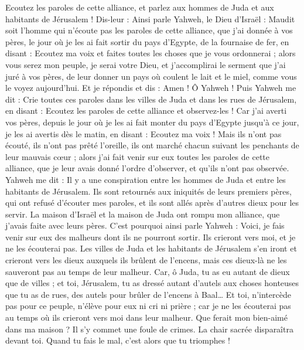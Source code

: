 \begin{multicols}{2}
Ecoutez les paroles de cette alliance, et parlez aux hommes de Juda et aux habitants de Jérusalem !
Dis-leur : Ainsi parle Yahweh, le Dieu d'Israël : Maudit soit l'homme qui n'écoute pas les paroles de cette alliance,
que j'ai donnée à vos pères, le jour où je les ai fait sortir du pays d'Egypte, de la fournaise de fer, en disant : Ecoutez ma voix et faites toutes les choses que je vous ordonnerai ; alors vous serez mon peuple, je serai votre Dieu,
et j'accomplirai le serment que j'ai juré à vos pères, de leur donner un pays où coulent le lait et le miel, comme vous le voyez aujourd'hui. Et je répondis et dis : Amen ! Ô Yahweh !
Puis Yahweh me dit : Crie toutes ces paroles dans les villes de Juda et dans les rues de Jérusalem, en disant : Ecoutez les paroles de cette alliance et observez-les !
Car j'ai averti vos pères, depuis le jour où je les ai fait monter du pays d'Egypte jusqu'à ce jour, je les ai avertis dès le matin, en disant : Ecoutez ma voix !
Mais ils n'ont pas écouté, ils n'ont pas prêté l'oreille, ils ont marché chacun suivant les penchants de leur mauvais cœur ; alors j'ai fait venir sur eux toutes les paroles de cette alliance, que je leur avais donné l'ordre d'observer, et qu'ils n'ont pas observée.
Yahweh me dit : Il y a une conspiration entre les hommes de Juda et entre les habitants de Jérusalem.
Ils sont retournés aux iniquités de leurs premiers pères, qui ont refusé d'écouter mes paroles, et ils sont allés après d'autres dieux pour les servir. La maison d'Israël et la maison de Juda ont rompu mon alliance, que j'avais faite avec leurs pères.
C'est pourquoi ainsi parle Yahweh : Voici, je fais venir sur eux des malheurs dont ils ne pourront sortir. Ils crieront vers moi, et je ne les écouterai pas.
Les villes de Juda et les habitants de Jérusalem s'en iront et crieront vers les dieux auxquels ils brûlent de l'encens, mais ces dieux-là ne les sauveront pas au temps de leur malheur.
Car, ô Juda, tu as eu autant de dieux que de villes ; et toi, Jérusalem, tu as dressé autant d'autels aux choses honteuses que tu as de rues, des autels pour brûler de l'encens à Baal…
Et toi, n'intercède pas pour ce peuple, n'élève pour eux ni cri ni prière ; car je ne les écouterai pas au temps où ils crieront vers moi dans leur malheur.
Que ferait mon bien-aimé dans ma maison ? Il s'y commet une foule de crimes. La chair sacrée disparaîtra devant toi. Quand tu fais le mal, c'est alors que tu triomphes !

\end{multicols}
